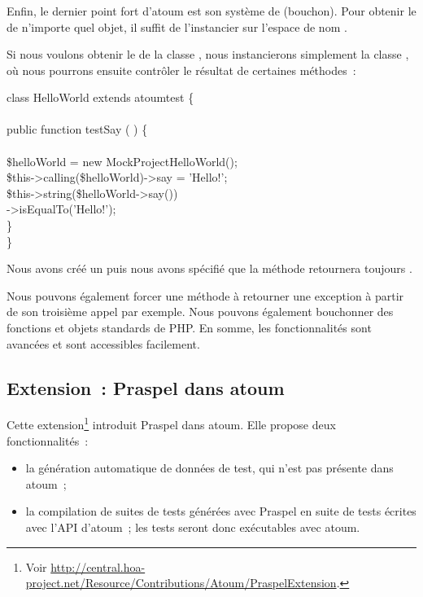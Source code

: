 \subsubsection{}

Enfin, le dernier point fort d'atoum est son système de 
(bouchon). Pour obtenir le  de n'importe quel objet, il suffit
de l'instancier sur l'espace de nom .

\begin{example}

Si nous voulons obtenir le  de la classe
, nous instancierons simplement la classe
, où nous pourrons ensuite
contrôler le résultat de certaines méthodes~:
%
\begin{pre}
class HelloWorld extends \bslash{}atoum\bslash{}test \{ \\
 \\
    public function testSay ( ) \{ \\
 \\
        \$helloWorld = new \bslash{}Mock\bslash{}Project\bslash{}HelloWorld(); \\
        \$this->calling(\$helloWorld)->say = 'Hello!'; \\
        \$this->string(\$helloWorld->say()) \\
                  ->isEqualTo('Hello!'); \\
    \} \\
\}
\end{pre}
%
Nous avons créé un  puis nous avons spécifié que la méthode
 retournera toujours .

\end{example}

Nous pouvons également forcer une méthode à retourner une exception à partir de
son troisième appel par exemple. Nous pouvons également bouchonner des fonctions
et objets standards de PHP. En somme, les fonctionnalités sont avancées et sont
accessibles facilement.

\subsection{Extension~: Praspel dans atoum}

Cette extension\footnote{Voir
\url{http://central.hoa-project.net/Resource/Contributions/Atoum/PraspelExtension}.}
introduit Praspel dans atoum. Elle propose deux fonctionnalités~:
%
\begin{itemize}

\item la génération automatique de données de test, qui n'est pas présente dans
atoum~;

\item la compilation de suites de tests générées avec Praspel en suite de tests
écrites avec l'API d'atoum~; les tests seront donc exécutables avec atoum.

\end{itemize}

